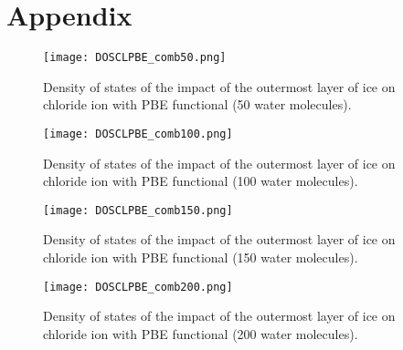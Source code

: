 \documentclass[a4paper,11pt]{report}
\begin{document}
\section{Appendix}
\begin{figure}[H]\large
\texttt{[image: DOSCLPBE\_comb50.png]}
\caption{Density of states of the impact of the outermost layer of ice on chloride ion with PBE functional (50 water molecules).}
\label{figure1b}
\end{figure}

\begin{figure}[H]\large
\texttt{[image: DOSCLPBE\_comb100.png]}
\caption{Density of states of the impact of the outermost layer of ice on chloride ion with PBE functional (100 water molecules).}
\label{figure2b}
\end{figure}

\begin{figure}[H]\large
\texttt{[image: DOSCLPBE\_comb150.png]}
\caption{Density of states of the impact of the outermost layer of ice on chloride ion with PBE functional (150 water molecules).}
\label{figure3b}
\end{figure}

\begin{figure}[H]\large
\texttt{[image: DOSCLPBE\_comb200.png]}
\caption{Density of states of the impact of the outermost layer of ice on chloride ion with PBE functional (200 water molecules).}
\label{figure4b}
\end{figure}





\end{document}
